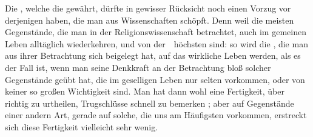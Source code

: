\begin{aufza}
\begin{aufzb}
\begin{RWanm} 
Die , welche die  gewährt, dürfte in gewisser Rücksicht noch einen Vorzug vor derjenigen haben, die man aus  Wissenschaften schöpft. Denn weil die meisten Gegenstände, die man in der Religionswissenschaft betrachtet, auch im gemeinen Leben alltäglich wiederkehren, und von der~\ höchsten  sind: so wird die , die man aus ihrer Betrachtung sich beigelegt hat, auf das wirkliche Leben  werden, als es der Fall ist, wenn man seine Denkkraft an der Betrachtung bloß solcher Gegenstände geübt hat, die im geselligen Leben nur selten vorkommen, oder von keiner so großen Wichtigkeit sind. Man hat dann wohl eine Fertigkeit, über  richtig zu urtheilen, Trugschlüsse  schnell zu bemerken \usw ; aber auf Gegenstände einer andern Art, gerade auf solche, die uns am Häufigsten vorkommen, erstreckt sich diese Fertigkeit vielleicht sehr wenig.
\end{RWanm}

\end{aufzb}
\end{aufza}
